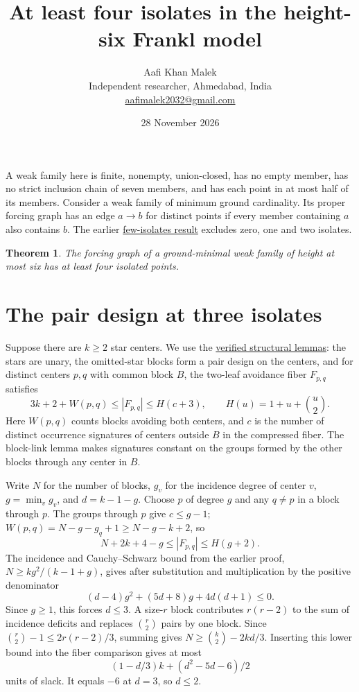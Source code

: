 \documentclass[11pt,letterpaper]{article}
\title{At least four isolates in the height-six Frankl model}
\author{Aafi Khan Malek\\ \small Independent researcher, Ahmedabad, India\\
\small\href{mailto:aafimalek2032@gmail.com}{aafimalek2032@gmail.com}}
\date{28 November 2026}
\newtheorem{theorem}{Theorem}
\begin{document}
\maketitle
A weak family here is finite, nonempty, union-closed, has no empty
member, has no strict inclusion chain of seven members, and has
each point in at most half of its members. Consider a weak family
of minimum ground cardinality. Its proper forcing graph has
an edge \(a\to b\) for distinct points if every member containing
\(a\) also contains \(b\). The earlier
\href{https://github.com/Aafimalek/novel-discoveries/blob/921b03c9fea735147d66af395e1732f01751c62d/frankl-height-six/verification/at-least-three-isolates/paper/few-isolates.pdf}
{few-isolates result} excludes zero, one and two isolates.

\begin{theorem}
The forcing graph of a ground-minimal weak family of height at most six
has at least four isolated points.
\end{theorem}

\section{The pair design at three isolates}
Suppose there are \(k\ge2\) star centers. We use the
\href{https://github.com/Aafimalek/novel-discoveries/tree/043d266655932e3badfe48220085216e90065dd6/frankl-height-six}
{verified structural lemmas}: the stars are unary, the omitted-star
blocks form a pair design on the centers, and for distinct centers
\(p,q\) with common block \(B\), the two-leaf avoidance fiber
\(F_{p,q}\) satisfies
\[
  3k+2+W(p,q)\le |F_{p,q}|\le H(c+3),
  \qquad H(u)=1+u+\binom u2.
\]
Here \(W(p,q)\) counts blocks avoiding both centers, and \(c\) is
the number of distinct occurrence signatures of centers outside
\(B\) in the compressed fiber. The block-link lemma makes
signatures constant on the groups formed by the other blocks
through any center in \(B\).

Write \(N\) for the number of blocks, \(g_v\) for the incidence
degree of center \(v\), \(g=\min_vg_v\), and \(d=k-1-g\).
Choose \(p\) of degree \(g\) and any \(q\ne p\) in a block
through \(p\). The groups through \(p\) give \(c\le g-1\);
\(W(p,q)=N-g-g_q+1\ge N-g-k+2\), so
\[
 N+2k+4-g\le |F_{p,q}|\le H(g+2).
\]
The incidence and Cauchy--Schwarz bound from the earlier proof,
\(N\ge kg^2/(k-1+g)\), gives after substitution and multiplication
by the positive denominator
\[
 (d-4)g^2+(5d+8)g+4d(d+1)\le0 .
\]
Since \(g\ge1\), this forces \(d\le3\). A size-\(r\) block
contributes \(r(r-2)\) to the sum of incidence deficits and replaces
\(\binom r2\) pairs by one block. Since
\(\binom r2-1\le 2r(r-2)/3\), summing gives
\(N\ge\binom k2-2kd/3\). Inserting this lower bound into the fiber
comparison gives at most
\[
   (1-d/3)k+(d^2-5d-6)/2
\]
units of slack. It equals \(-6\) at \(d=3\), so \(d\le2\).
\end{document}
